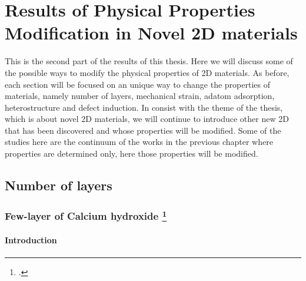 
\chapter{Results of Physical Properties Modification in Novel 2D materials \label{chap:5}}

\ifpdf
    \graphicspath{{Chapter5/Figs/Raster/}{Chapter5/Figs/PDF/}{Chapter5/Figs/}{Chapter5/Figs/Vector/}}
\else
    \graphicspath{{Chapter5/Figs/Vector/}{Chapter5/Figs/}}
\fi

This is the second part of the results of this thesis. Here we will discuss some of the possible ways to modify the physical properties of 2D materials. As before, each section will be focused on an unique way to change the properties of materials, namely number of layers, mechanical strain, adatom adsorption, heterostructure and defect induction. In consist with the theme of the thesis, which is about novel 2D materials, we will continue to introduce other new 2D that has been discovered and whose properties will be modified. Some of the studies here are the continuum of the works in the previous chapter where properties are determined only, here those properties will be modified. 




\section{Number of layers}
\subsection[Few-layer of Calcium hydroxide]{Few-layer of Calcium hydroxide \footcite[This work is published in:][]{Aierken2015.porlandite}}

\subsubsection{Introduction}

